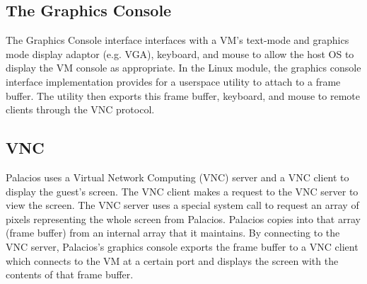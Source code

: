 \documentclass{acm_proc_article-sp}
\begin{document}
\subsection{The Graphics Console} %
The Graphics Console interface interfaces with a VM's text\--mode and graphics
mode display adaptor (e.g. VGA), keyboard, and mouse to allow the host OS to display the VM
console as appropriate. In the Linux module, the graphics console interface implementation provides
for a userspace utility to attach to a frame buffer. The utility then exports this frame buffer, keyboard,
and mouse to remote clients through the VNC protocol. \cite{Dinda: Technical}

\subsection{VNC}
Palacios uses a Virtual Network Computing (VNC) server and a VNC client to
display the guest's screen. The VNC client makes a request to the VNC server to view the screen. 
The VNC server uses a special system call to request an array of pixels representing the whole screen from Palacios. 
Palacios copies into that array (frame buffer) from an internal array that it
maintains. By connecting to the VNC server, Palacios's graphics console exports
the frame buffer to a VNC client which connects to the VM at a certain port and
displays the screen with the contents of that frame buffer.
\end{document}
